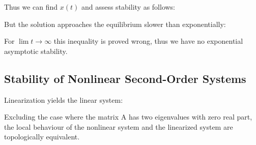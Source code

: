 \documentclass[10pt,a4paper]{scrartcl}
\begin{document}
\begin{multicols*}{3}

Thus we can find $x(t)$ and assess stability as follows:



But the solution approaches the equilibrium slower than exponentially:


For $\lim t\rightarrow \infty$ this inequality is proved wrong, thus we have no exponential asymptotic stability.

\subsection{Stability of Nonlinear Second-Order Systems}


Linearization yields the linear system:


Excluding the case where the matrix A has two eigenvalues with zero real part, the local behaviour of the nonlinear system and the linearized system are topologically equivalent.



\end{multicols*}
\end{document}
